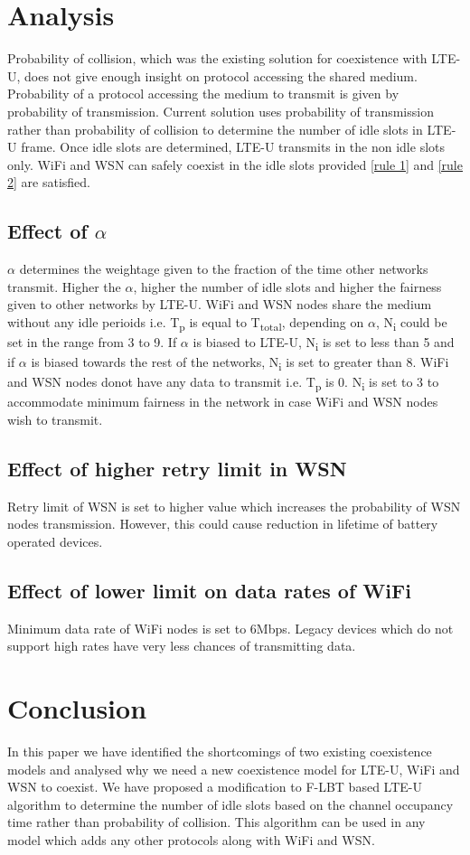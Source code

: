\documentclass[a4paper]{article}
\begin{document}
\section{Analysis}
Probability of collision, which was the existing solution for coexistence with {LTE-U}, does not give enough insight on protocol accessing the shared medium. Probability of a protocol accessing the medium to transmit is given by probability of transmission. Current solution uses probability of transmission rather than probability of collision to determine the number of idle slots in {LTE-U} frame. Once idle slots are determined, {LTE-U} transmits in the non idle slots only. {WiFi} and {WSN} can safely coexist in the idle slots provided \ref{rule 1} and \ref{rule 2} are satisfied.
\subsection{Effect of $\alpha$}
$\alpha$ determines the weightage given to the fraction of the time other networks transmit. Higher the $\alpha$, higher the number of idle slots and higher the fairness given to other networks by {LTE-U}.
{WiFi} and {WSN} nodes share the medium without any idle perioids i.e. {T\textsubscript{p}} is equal to {T\textsubscript{total}}, depending on $\alpha$, N\textsubscript{i} could be set in the range from 3 to 9. If $\alpha$ is biased to {LTE-U}, N\textsubscript{i} is set to less than 5 and if $\alpha$ is biased towards the rest of the networks, N\textsubscript{i} is set to greater than 8.
{WiFi} and {WSN} nodes donot have any data to transmit i.e.  {T\textsubscript{p}} is 0. N\textsubscript{i} is set to 3 to accommodate minimum fairness in the network in case {WiFi} and {WSN} nodes wish to transmit. 
\subsection{Effect of higher retry limit in {WSN}}
Retry limit of {WSN} is set to higher value which increases the probability of {WSN} nodes transmission. However, this could cause reduction in lifetime of  battery operated devices. 
\subsection{Effect of lower limit on data rates of {WiFi}}
Minimum data rate of {WiFi} nodes is set to 6Mbps. Legacy devices which do not support high rates have very less chances of transmitting data. 

\section{Conclusion}
In this paper we have identified the shortcomings of two existing coexistence models and analysed why we need a new coexistence model for {LTE-U}, {WiFi} and {WSN} to coexist.
We have proposed a modification to {F-LBT} based {LTE-U} algorithm to determine the number of idle slots based on the channel occupancy time rather than probability of collision. This algorithm can be used in any model which adds any other protocols along with {WiFi} and {WSN}. \par
\end{document}

